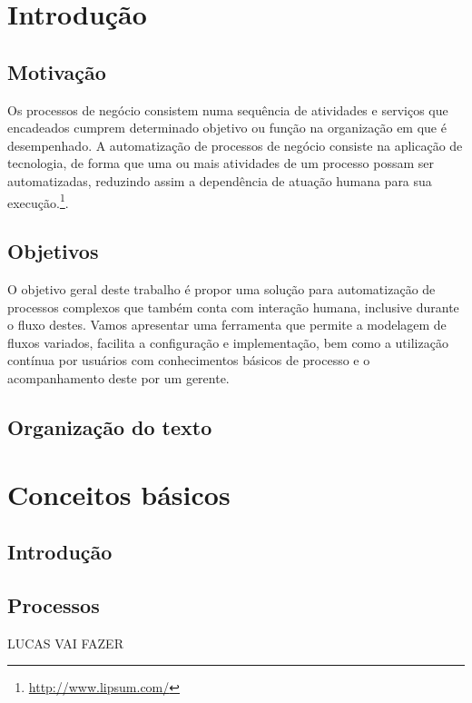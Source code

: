 \chapter{Introdução}\label{chp:LABEL_CHP_1}

\section{Motivação}\label{sec:LABEL_CHP_1_SEC_A}
Os processos de negócio consistem numa sequência de atividades e serviços que  encadeados cumprem determinado objetivo ou função na organização em que é desempenhado. A automatização de processos de negócio consiste na aplicação de tecnologia, de forma que uma ou mais atividades de um processo possam ser automatizadas, reduzindo assim a dependência de atuação humana para sua execução.\footnote{\url{http://www.lipsum.com/}}.

\section{Objetivos}\label{sec:LABEL_CHP_1_SEC_B}
O objetivo geral deste trabalho é propor uma solução para automatização de processos complexos que também conta com interação humana, inclusive durante o fluxo destes. Vamos apresentar uma ferramenta que permite a modelagem de fluxos variados, facilita a configuração e implementação, bem como a utilização contínua por usuários com conhecimentos básicos de processo e o acompanhamento deste por um gerente.

\section{Organização do texto}\label{sec:LABEL_CHP_1_SEC_C}

\chapter{Conceitos básicos}\label{chp:LABEL_CHP_2}

\section{Introdução}\label{sec:LABEL_CHP_2_SEC_A}

\section{Processos}\label{sec:LABEL_CHP_2_SEC_B}
LUCAS VAI FAZER

